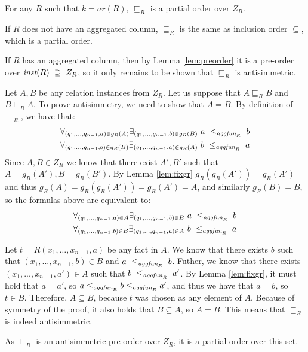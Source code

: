 \begin{lem}
For any $R$ such that $k=ar(R)$, $\sqsubseteq_R$ is a partial order over $Z_R$.
\end{lem}
\begin{prof}
If $R$ does not have an aggregated column, $\sqsubseteq_R$ is the same as inclusion order $\subseteq$, which is a partial order.

If $R$ has an aggregated column, then by Lemma \ref{lem:preorder} it is a pre-order over $\textit{inst}(R)~\supseteq~Z_R$, so it only remains to be shown that $\sqsubseteq_R$ is antisimmetric.

Let $A, B$ be any relation instances from $Z_R$. Let us suppose that $A \sqsubseteq_R B$ and $B \sqsubseteq_R A$. To prove antisimmetry, we need to show that $A = B$. By definition of $\sqsubseteq_R$, we have that:
\begin{align*}
\forall_{(q_1, ..., q_{n-1}, a) \in g_R(A)} \exists_{(q_1, ..., q_{n-1}, b) \in g_R(B)}~a~\le_{\textit{aggfun}_R}~b \\
\forall_{(q_1, ..., q_{n-1}, b) \in g_R(B)} \exists_{(q_1, ..., q_{n-1}, a) \in g_R(A)}~b~\le_{\textit{aggfun}_R}~a
\end{align*}
Since $A, B \in Z_R$ we know that there exist $A', B'$ such that $A = g_R(A'), B = g_R(B')$. By Lemma \ref{lem:fixgr} $g_R(g_R(A')) = g_R(A')$ and thus $g_R(A) = g_R(g_R(A')) = g_R(A') = A$, and similarly $g_R(B) = B$, so the formulas above are equivalent to:
\begin{align*}
\forall_{(q_1, ..., q_{n-1}, a) \in A} \exists_{(q_1, ..., q_{n-1}, b) \in B}~a~\le_{\textit{aggfun}_R}~b \\
\forall_{(q_1, ..., q_{n-1}, b) \in B} \exists_{(q_1, ..., q_{n-1}, a) \in A}~b~\le_{\textit{aggfun}_R}~a
\end{align*}

Let $t = R(x_1, \dots, x_{n-1}, a)$ be any fact in $A$. We know that there exists $b$ such that $(x_1, ..., x_{n-1}, b) \in B$ and $a~\le_{\textit{aggfun}_R}~b$. Futher, we know that there exists $(x_1, ..., x_{n-1}, a') \in A$ such that $b~\le_{\textit{aggfun}_R}~a'$. By Lemma \ref{lem:fixgr}, it must hold that $a = a'$, so $a \le_{\textit{aggfun}_R} b \le_{\textit{aggfun}_R} a'$, and thus we have that $a = b$, so $t \in B$. Therefore, $A \subseteq B$, because $t$ was chosen as any element of $A$. Because of symmetry of the proof, it also holds that $B \subseteq A$, so $A = B$. This means that $\sqsubseteq_R$ is indeed antisimmetric.

As $\sqsubseteq_R$ is an antisimmetric pre-order over $Z_R$, it is a partial order over this set.
\end{prof}

